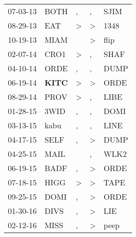 \begin{supertabular}{p{0.07\textwidth}p{0.06\textwidth}p{0.02\textwidth}p{0.02\textwidth}p{0.06\textwidth}}
 07-03-13\textsuperscript{} &           BOTH\textsuperscript{} &             , &             , &           SJIM\textsuperscript{} \\
 08-29-13\textsuperscript{} &            EAT\textsuperscript{} &  \textgreater &  \textgreater &           1348\textsuperscript{} \\
 10-19-13\textsuperscript{} &           MIAM\textsuperscript{} &               &  \textgreater &           flip\textsuperscript{} \\
 02-07-14\textsuperscript{} &           CRO1\textsuperscript{} &  \textgreater &             , &           SHAF\textsuperscript{} \\
 04-10-14\textsuperscript{} &           ORDE\textsuperscript{} &             , &             , &           DUMP\textsuperscript{} \\
 06-19-14\textsuperscript{} &  \textbf{KITC\textsuperscript{}} &  \textgreater &  \textgreater &           ORDE\textsuperscript{} \\
 08-29-14\textsuperscript{} &           PROV\textsuperscript{} &  \textgreater &             , &           LIBE\textsuperscript{} \\
 01-28-15\textsuperscript{} &           3WID\textsuperscript{} &             , &             , &           DOMI\textsuperscript{} \\
 03-13-15\textsuperscript{} &           kabu\textsuperscript{} &             , &             , &           LINE\textsuperscript{} \\
 04-17-15\textsuperscript{} &           SELF\textsuperscript{} &             , &  \textgreater &           DUMP\textsuperscript{} \\
 04-25-15\textsuperscript{} &           MAIL\textsuperscript{} &               &             , &           WLK2\textsuperscript{} \\
 06-19-15\textsuperscript{} &           BADF\textsuperscript{} &             , &  \textgreater &           ORDE\textsuperscript{} \\
 07-18-15\textsuperscript{} &           HIGG\textsuperscript{} &  \textgreater &  \textgreater &           TAPE\textsuperscript{} \\
 09-25-15\textsuperscript{} &           DOMI\textsuperscript{} &             , &  \textgreater &           ORDE\textsuperscript{} \\
 01-30-16\textsuperscript{} &           DIVS\textsuperscript{} &             , &  \textgreater &            LIE\textsuperscript{} \\
 02-12-16\textsuperscript{} &           MISS\textsuperscript{} &             , &  \textgreater &           peep\textsuperscript{} \\

\end{supertabular}
